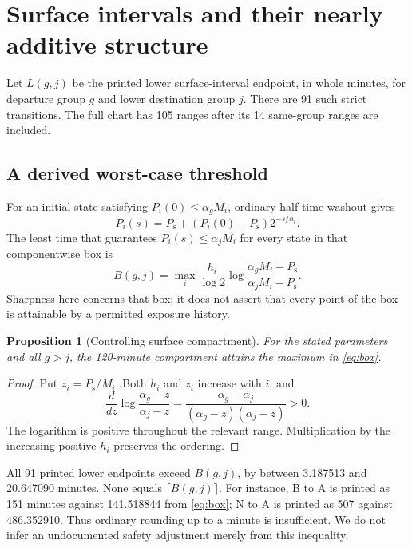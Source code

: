 \documentclass[11pt,letterpaper]{article}
\newtheorem{proposition}{Proposition}
\newcommand{\Ps}{P_{\mathrm{s}}}
\begin{document}
\section{Surface intervals and their nearly additive structure}
Let $L(g,j)$ be the printed lower surface-interval endpoint, in whole minutes, for departure group $g$ and lower destination group $j$. There are 91 such strict transitions. The full chart has 105 ranges after its 14 same-group ranges are included.

\subsection{A derived worst-case threshold}
For an initial state satisfying $P_i(0)\le\alpha_gM_i$, ordinary half-time washout gives
\[
P_i(s)=\Ps+(P_i(0)-\Ps)2^{-s/h_i}.
\]
The least time that guarantees $P_i(s)\le\alpha_jM_i$ for every state in that componentwise box is
\begin{equation}
B(g,j)=\max_i\frac{h_i}{\log2}
\log\frac{\alpha_gM_i-\Ps}{\alpha_jM_i-\Ps}.
\label{eq:box}
\end{equation}
Sharpness here concerns that box; it does not assert that every point of the box is attainable by a permitted exposure history.

\begin{proposition}[Controlling surface compartment]
For the stated parameters and all $g>j$, the 120-minute compartment attains the maximum in \eqref{eq:box}.
\end{proposition}
\begin{proof}
Put $z_i=\Ps/M_i$. Both $h_i$ and $z_i$ increase with $i$, and
\[
\frac{d}{dz}\log\frac{\alpha_g-z}{\alpha_j-z}
=\frac{\alpha_g-\alpha_j}{(\alpha_g-z)(\alpha_j-z)}>0.
\]
The logarithm is positive throughout the relevant range. Multiplication by the increasing positive $h_i$ preserves the ordering.
\end{proof}

All 91 printed lower endpoints exceed $B(g,j)$, by between 3.187513 and 20.647090 minutes. None equals $\lceil B(g,j)\rceil$. For instance, B to A is printed as 151 minutes against 141.518844 from \eqref{eq:box}; N to A is printed as 507 against 486.352910. Thus ordinary rounding up to a minute is insufficient. We do not infer an undocumented safety adjustment merely from this inequality.
\end{document}
